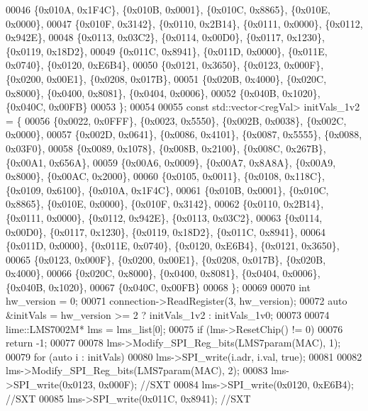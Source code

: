 \begin{DoxyCode}
00046         \{0x010A, 0x1F4C\}, \{0x010B, 0x0001\}, \{0x010C, 0x8865\}, \{0x010E, 0x0000\},
00047         \{0x010F, 0x3142\}, \{0x0110, 0x2B14\}, \{0x0111, 0x0000\}, \{0x0112, 0x942E\},
00048         \{0x0113, 0x03C2\}, \{0x0114, 0x00D0\}, \{0x0117, 0x1230\}, \{0x0119, 0x18D2\},
00049         \{0x011C, 0x8941\}, \{0x011D, 0x0000\}, \{0x011E, 0x0740\}, \{0x0120, 0xE6B4\},
00050         \{0x0121, 0x3650\}, \{0x0123, 0x000F\}, \{0x0200, 0x00E1\}, \{0x0208, 0x017B\},
00051         \{0x020B, 0x4000\}, \{0x020C, 0x8000\}, \{0x0400, 0x8081\}, \{0x0404, 0x0006\},
00052         \{0x040B, 0x1020\}, \{0x040C, 0x00FB\}
00053     \};
00054 
00055     \textcolor{keyword}{const} std::vector<regVal> initVals\_1v2 = \{
00056         \{0x0022, 0x0FFF\}, \{0x0023, 0x5550\}, \{0x002B, 0x0038\}, \{0x002C, 0x0000\},
00057         \{0x002D, 0x0641\}, \{0x0086, 0x4101\}, \{0x0087, 0x5555\}, \{0x0088, 0x03F0\},
00058         \{0x0089, 0x1078\}, \{0x008B, 0x2100\}, \{0x008C, 0x267B\}, \{0x00A1, 0x656A\},
00059         \{0x00A6, 0x0009\}, \{0x00A7, 0x8A8A\}, \{0x00A9, 0x8000\}, \{0x00AC, 0x2000\},
00060         \{0x0105, 0x0011\}, \{0x0108, 0x118C\}, \{0x0109, 0x6100\}, \{0x010A, 0x1F4C\},
00061         \{0x010B, 0x0001\}, \{0x010C, 0x8865\}, \{0x010E, 0x0000\}, \{0x010F, 0x3142\},
00062         \{0x0110, 0x2B14\}, \{0x0111, 0x0000\}, \{0x0112, 0x942E\}, \{0x0113, 0x03C2\},
00063         \{0x0114, 0x00D0\}, \{0x0117, 0x1230\}, \{0x0119, 0x18D2\}, \{0x011C, 0x8941\},
00064         \{0x011D, 0x0000\}, \{0x011E, 0x0740\}, \{0x0120, 0xE6B4\}, \{0x0121, 0x3650\},
00065         \{0x0123, 0x000F\}, \{0x0200, 0x00E1\}, \{0x0208, 0x017B\}, \{0x020B, 0x4000\},
00066         \{0x020C, 0x8000\}, \{0x0400, 0x8081\}, \{0x0404, 0x0006\}, \{0x040B, 0x1020\},
00067         \{0x040C, 0x00FB\}
00068     \};
00069 
00070     \textcolor{keywordtype}{int} hw\_version = 0;
00071     connection->ReadRegister(3, hw\_version);
00072     \textcolor{keyword}{auto} &initVals = hw\_version >= 2 ? initVals\_1v2 : initVals\_1v0;
00073 
00074     lime::LMS7002M* lms = lms_list[0];
00075     \textcolor{keywordflow}{if} (lms->ResetChip() != 0)
00076         \textcolor{keywordflow}{return} -1;
00077 
00078     lms->Modify_SPI_Reg_bits(LMS7param(MAC), 1);
00079     \textcolor{keywordflow}{for} (\textcolor{keyword}{auto} i : initVals)
00080         lms->SPI_write(i.adr, i.val, \textcolor{keyword}{true});
00081 
00082     lms->Modify_SPI_Reg_bits(LMS7param(MAC), 2);
00083     lms->SPI_write(0x0123, 0x000F);  \textcolor{comment}{//SXT}
00084     lms->SPI_write(0x0120, 0xE6B4);  \textcolor{comment}{//SXT}
00085     lms->SPI_write(0x011C, 0x8941);  \textcolor{comment}{//SXT}

\end{DoxyCode}
